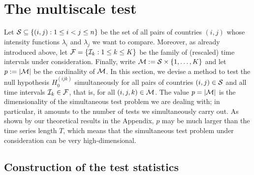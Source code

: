 \documentclass[a4paper,12pt]{article}
\numberwithin{equation}{section}
\begin{document}
 

\section{The multiscale test}\label{sec:test}


Let $\mathcal{S} \subseteq \{ (i,j): 1 \le i < j \le n \}$ be the set of all pairs of countries $(i,j)$ whose intensity functions $\lambda_i$ and $\lambda_j$ we want to compare. Moreover, as already introduced above, let $\mathcal{F} = \{ \mathcal{I}_k: 1 \le k \le K \}$ be the family of (rescaled) time intervals under consideration. Finally, write $\mathcal{M} := \mathcal{S} \times \{1,\ldots,K\}$ and let $p := |\mathcal{M}|$ be the cardinality of $\mathcal{M}$. In this section, we devise a method to test the null hypothesis $H_0^{(ijk)}$ simultaneously for all pairs of countries $(i,j) \in \mathcal{S}$ and all time intervals $\mathcal{I}_k \in \mathcal{F}$, that is, for all $(i,j,k) \in \mathcal{M}$. The value $p = |\mathcal{M}|$ is the dimensionality of the simultaneous test problem we are dealing with; in particular, it amounts to the number of tests we simultaneously carry out. As shown by our theoretical results in the Appendix, $p$ may be much larger than the time series length $T$, which means that the simultaneous test problem under consideration can be very high-dimensional. 


\subsection{Construction of the test statistics}\label{subsec:test:test}
\end{document}
